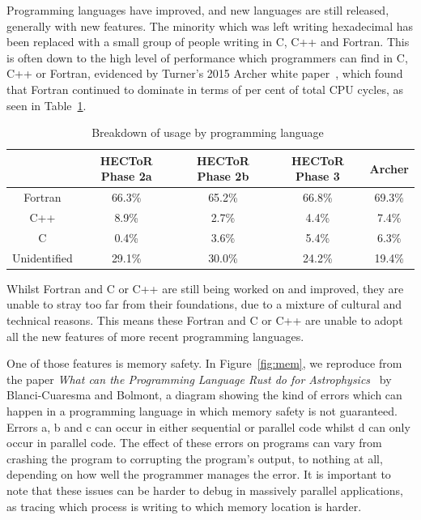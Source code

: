 \documentclass{report}[a4]
\begin{document}
Programming languages have improved, and new languages are still released, generally with new features. The minority which was left writing hexadecimal has been replaced with a small group of people writing in C, C++ and Fortran. This is often down to the high level of performance which programmers can find in C, C++ or Fortran, evidenced by Turner's 2015 Archer white paper~\cite{Turner2015}, which found that Fortran continued to dominate in terms of per cent of total CPU cycles, as seen in Table~\ref{tab:langs}.
\begin{table}[h]
  \centering
  \label{tab:langs}
  \begin{tabular}{|c|c|c|c|c|}
    \hline
    & \textbf{HECToR Phase 2a} & \textbf{HECToR Phase 2b} & \textbf{HECToR Phase 3} & \textbf{Archer} \\
    \hline
    Fortran & 66.3\% & 65.2\% & 66.8\% & 69.3\% \\
    \hline
    C++ & 8.9\% & 2.7\% & 4.4\% & 7.4\% \\
    \hline
    C & 0.4\% & 3.6\% & 5.4\% & 6.3\% \\
    \hline
    Unidentified & 29.1\% &  30.0\% & 24.2\% & 19.4\% \\
    \hline
  \end{tabular}
  \caption{Breakdown of usage by programming language~\cite{Turner2015}}
\end{table}

Whilst Fortran and C or C++ are still being worked on and improved, they are unable to stray too far from their foundations, due to a mixture of cultural and technical reasons. This means these Fortran and C or C++ are unable to adopt all the new features of more recent programming languages.

One of those features is memory safety. In Figure~\ref{fig:mem}, we reproduce from the paper \textit{What can the Programming Language Rust do for Astrophysics}~\cite{blanco-cuaresma_bolmont_2016} by Blanci-Cuaresma and Bolmont, a diagram showing the kind of errors which can happen in a programming language in which memory safety is not guaranteed.
Errors a, b and c can occur in either sequential or parallel code whilst d can only occur in parallel code. The effect of these errors on programs can vary from crashing the program to corrupting the program's output, to nothing at all, depending on how well the programmer manages the error. It is important to note that these issues can be harder to debug in massively parallel applications, as tracing which process is writing to which memory location is harder.
\end{document}
